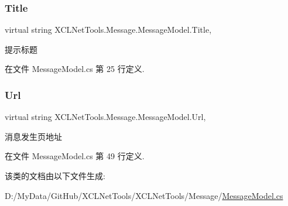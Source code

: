 \subsubsection{\texorpdfstring{Title}{Title}}
{\footnotesize\ttfamily virtual string X\+C\+L\+Net\+Tools.\+Message.\+Message\+Model.\+Title\hspace{0.3cm}{\ttfamily [get]}, {\ttfamily [set]}}



提示标题 



在文件 Message\+Model.\+cs 第 25 行定义.

\mbox{\label{class_x_c_l_net_tools_1_1_message_1_1_message_model_a35cd14fdd9bbc8dea4c151c00d538755}} 
\subsubsection{\texorpdfstring{Url}{Url}}
{\footnotesize\ttfamily virtual string X\+C\+L\+Net\+Tools.\+Message.\+Message\+Model.\+Url\hspace{0.3cm}{\ttfamily [get]}, {\ttfamily [set]}}



消息发生页地址 



在文件 Message\+Model.\+cs 第 49 行定义.



该类的文档由以下文件生成\+:\begin{DoxyCompactItemize}
\item 
D\+:/\+My\+Data/\+Git\+Hub/\+X\+C\+L\+Net\+Tools/\+X\+C\+L\+Net\+Tools/\+Message/\hyperlink{_message_model_8cs}{Message\+Model.\+cs}\end{DoxyCompactItemize}
